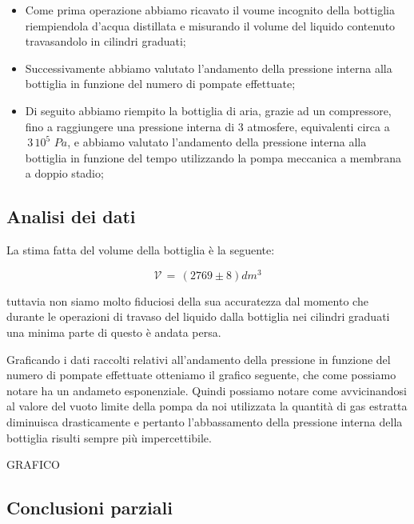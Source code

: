 \begin{itemize}
	\item{Come prima operazione abbiamo ricavato il voume incognito della bottiglia riempiendola d'acqua distillata e misurando il volume del liquido contenuto travasandolo in cilindri graduati;}
	\item{Successivamente abbiamo valutato l'andamento della pressione interna alla bottiglia in funzione del numero di pompate effettuate;}
	\item{Di seguito abbiamo riempito la bottiglia di aria, grazie ad un compressore, fino a raggiungere una pressione interna di 3 atmosfere, equivalenti circa a $\,3\,10^5\,\,Pa$, e abbiamo valutato l'andamento della pressione interna alla bottiglia in funzione del tempo utilizzando la pompa meccanica a membrana a doppio stadio;}
\end{itemize}

\subsection{Analisi dei dati}

La stima fatta del volume della bottiglia è la seguente:

\begin{equation}
	\mathcal{V} \, = \, (2769 \pm 8) dm^3  
\end{equation}

tuttavia non siamo molto fiduciosi della sua accuratezza dal momento che durante le operazioni di travaso del liquido dalla bottiglia nei cilindri graduati una minima parte di questo è andata persa.

Graficando i dati raccolti relativi all'andamento della pressione in funzione del numero di pompate effettuate otteniamo il grafico seguente, che come possiamo notare ha un andameto esponenziale. Quindi possiamo notare come avvicinandosi al valore del vuoto limite della pompa da noi utilizzata la quantità di gas estratta diminuisca drasticamente e pertanto l'abbassamento della pressione interna della bottiglia risulti sempre più impercettibile.

GRAFICO



\subsection{Conclusioni parziali}